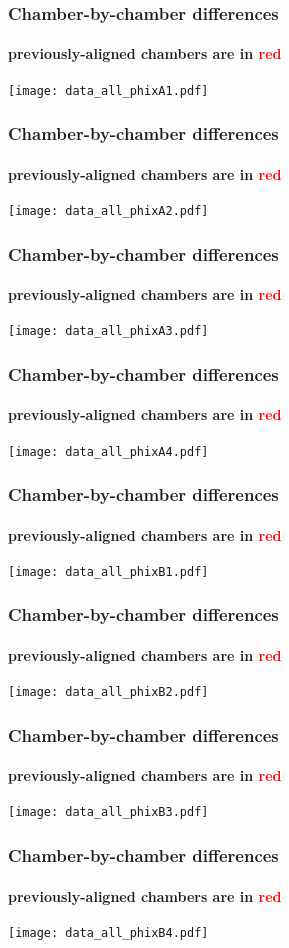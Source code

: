 \documentclass[compress]{beamer}
\begin{document}
\begin{frame}
\frametitle{Chamber-by-chamber differences}
\framesubtitle{previously-aligned chambers are in \textcolor{red}{red}}
\texttt{[image: data\_all\_phixA1.pdf]}
\end{frame}

\begin{frame}
\frametitle{Chamber-by-chamber differences}
\framesubtitle{previously-aligned chambers are in \textcolor{red}{red}}
\texttt{[image: data\_all\_phixA2.pdf]}
\end{frame}

\begin{frame}
\frametitle{Chamber-by-chamber differences}
\framesubtitle{previously-aligned chambers are in \textcolor{red}{red}}
\texttt{[image: data\_all\_phixA3.pdf]}
\end{frame}

\begin{frame}
\frametitle{Chamber-by-chamber differences}
\framesubtitle{previously-aligned chambers are in \textcolor{red}{red}}
\texttt{[image: data\_all\_phixA4.pdf]}
\end{frame}

\begin{frame}
\frametitle{Chamber-by-chamber differences}
\framesubtitle{previously-aligned chambers are in \textcolor{red}{red}}
\texttt{[image: data\_all\_phixB1.pdf]}
\end{frame}

\begin{frame}
\frametitle{Chamber-by-chamber differences}
\framesubtitle{previously-aligned chambers are in \textcolor{red}{red}}
\texttt{[image: data\_all\_phixB2.pdf]}
\end{frame}

\begin{frame}
\frametitle{Chamber-by-chamber differences}
\framesubtitle{previously-aligned chambers are in \textcolor{red}{red}}
\texttt{[image: data\_all\_phixB3.pdf]}
\end{frame}

\begin{frame}
\frametitle{Chamber-by-chamber differences}
\framesubtitle{previously-aligned chambers are in \textcolor{red}{red}}
\texttt{[image: data\_all\_phixB4.pdf]}
\end{frame}
\end{document}
